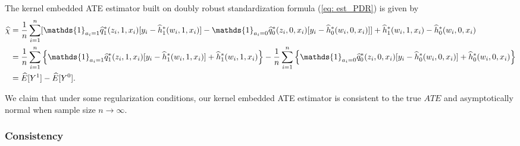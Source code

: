 The kernel embedded ATE estimator built on doubly robust standardization formula (\ref{eq: est_PDR}) is given by 
\begin{align}
    \label{eq: est_ATEestimator}
    \widehat{\chi} &= \frac{1}{n}\sum_{i=1}^{n}[\mathds{1}_{a_i=1}\widehat{q}^*_1(z_i,1,x_i)[y_i-\widehat{h}^*_1(w_i,1,x_i)]-\mathds{1}_{a_i=0}\widehat{q}^*_0(z_i,0,x_i)[y_i-\widehat{h}^*_0(w_i,0,x_i)]]+\widehat{h}^*_1(w_i,1,x_i)-\widehat{h}^*_0(w_i,0,x_i) \\
                   &= \frac{1}{n}\sum_{i=1}^{n}\left\{\mathds{1}_{a_i=1}\widehat{q}^*_1(z_i,1,x_i)[y_i-\widehat{h}^*_1(w_i,1,x_i)]+\widehat{h}^*_1(w_i,1,x_i)\right\} - \frac{1}{n}\sum_{i=1}^{n}\left\{\mathds{1}_{a_i=0}\widehat{q}^*_0(z_i,0,x_i)[y_i-\widehat{h}^*_0(w_i,0,x_i)]+\widehat{h}^*_0(w_i,0,x_i)\right\} \notag\\
                   &= \widehat{E}[Y^1] - \widehat{E}[Y^0]. \notag
\end{align}

We claim that under some regularization conditions, 
our kernel embedded ATE estimator is consistent to the true $ATE$ and asymptotically normal 
when sample size $n\rightarrow\infty$.

\subsubsection{Consistency}

